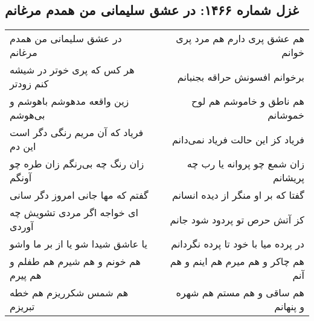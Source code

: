 \begin{center}
\section*{غزل شماره ۱۴۶۶: در عشق سلیمانی من همدم مرغانم}
\label{sec:1466}
\begin{longtable}{l p{0.5cm} r}
در عشق سلیمانی من همدم مرغانم
&&
هم عشق پری دارم هم مرد پری خوانم
\\
هر کس که پری خوتر در شیشه کنم زودتر
&&
برخوانم افسونش حراقه بجنبانم
\\
زین واقعه مدهوشم باهوشم و بی‌هوشم
&&
هم ناطق و خاموشم هم لوح خموشانم
\\
فریاد که آن مریم رنگی دگر است این دم
&&
فریاد کز این حالت فریاد نمی‌دانم
\\
زان رنگ چه بی‌رنگم زان طره چو آونگم
&&
زان شمع چو پروانه یا رب چه پریشانم
\\
گفتم که مها جانی امروز دگر سانی
&&
گفتا که بر او منگر از دیده انسانم
\\
ای خواجه اگر مردی تشویش چه آوردی
&&
کز آتش حرص تو پردود شود جانم
\\
یا عاشق شیدا شو یا از بر ما واشو
&&
در پرده میا با خود تا پرده نگردانم
\\
هم خونم و هم شیرم هم طفلم و هم پیرم
&&
هم چاکر و هم میرم هم اینم و هم آنم
\\
هم شمس شکرریزم هم خطه تبریزم
&&
هم ساقی و هم مستم هم شهره و پنهانم
\\
\end{longtable}
\end{center}
